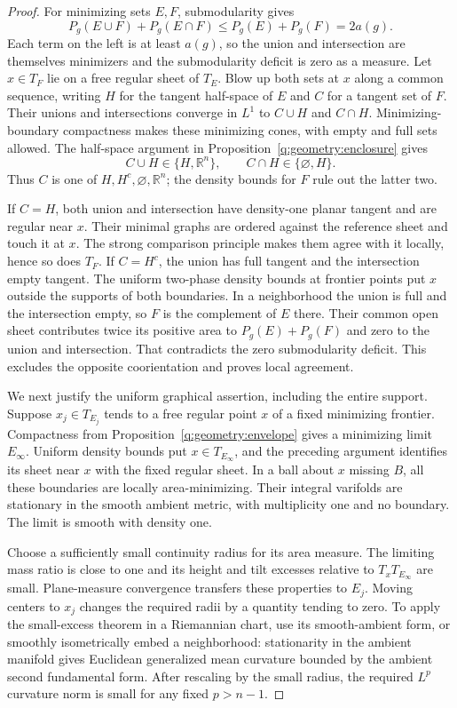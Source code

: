 \begin{proof}
For minimizing sets $E,F$, submodularity gives
\[
 P_g(E\cup F)+P_g(E\cap F)\le P_g(E)+P_g(F)=2a(g).
\]
Each term on the left is at least $a(g)$, so the union and
intersection are themselves minimizers and the submodularity deficit
is zero as a measure. Let $x\in T_F$ lie on a free regular sheet of
$T_E$. Blow up both sets at $x$ along a common sequence, writing
$H$ for the tangent half-space of $E$ and $C$ for a tangent set of
$F$. Their unions and intersections converge in $L^1$ to $C\cup H$
and $C\cap H$. Minimizing-boundary compactness makes these minimizing
cones, with empty and full sets allowed. The half-space argument in
Proposition~\ref{q:geometry:enclosure} gives
\[
 C\cup H\in\{H,\mathbb R^n\},\qquad
 C\cap H\in\{\varnothing,H\}.
\]
Thus $C$ is one of $H,H^c,\varnothing,\mathbb R^n$; the density
bounds for $F$ rule out the latter two.

If $C=H$, both union and intersection have density-one planar tangent
and are regular near $x$. Their minimal graphs are ordered against
the reference sheet and touch it at $x$. The strong comparison
principle makes them agree with it locally, hence so does $T_F$.
If $C=H^c$, the union has full tangent and the intersection empty
tangent. The uniform two-phase density bounds at frontier points
put $x$ outside the supports of both boundaries. In a neighborhood
the union is full and the intersection empty, so $F$ is the complement
of $E$ there. Their common open sheet contributes twice its positive
area to $P_g(E)+P_g(F)$ and zero to the union and intersection.
That contradicts the zero submodularity deficit. This excludes the
opposite coorientation and proves local agreement.

We next justify the uniform graphical assertion, including the
entire support. Suppose $x_j\in T_{E_j}$ tends to a free regular
point $x$ of a fixed minimizing frontier. Compactness from
Proposition~\ref{q:geometry:envelope} gives a minimizing limit
$E_\infty$. Uniform density bounds put $x\in T_{E_\infty}$, and
the preceding argument identifies its sheet near $x$ with the fixed
regular sheet. In a ball about $x$ missing $B$, all these boundaries
are locally area-minimizing. Their integral varifolds are stationary
in the smooth ambient metric, with multiplicity one and no boundary.
The limit is smooth with density one.

Choose a sufficiently small continuity radius for its area measure.
The limiting mass ratio is close to one and its height and tilt
excesses relative to $T_xT_{E_\infty}$ are small. Plane-measure
convergence transfers these properties to $E_j$. Moving centers to
$x_j$ changes the required radii by a quantity tending to zero.
To apply the small-excess theorem in a Riemannian chart, use its
smooth-ambient form, or smoothly isometrically embed a neighborhood:
stationarity in the ambient manifold gives Euclidean generalized
mean curvature bounded by the ambient second fundamental form.
After rescaling by the small radius, the required $L^p$ curvature
norm is small for any fixed $p>n-1$.


\end{proof}
